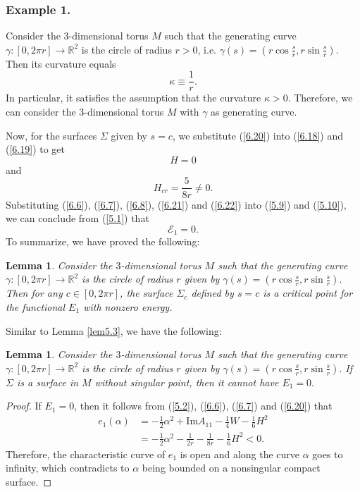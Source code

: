 \documentclass{amsart}
\newtheorem{lem}[theorem]{Lemma}
\theoremstyle{Corollary}
\numberwithin{equation}{section}
\begin{document}
\subsubsection{Example 1.} 
Consider the $3$-dimensional torus $M$ such that 
the generating curve $\gamma: [0,2\pi r]\to\mathbb{R}^2$ is the circle of radius $r>0$, i.e. 
$\gamma(s)=(r\cos\frac{s}{r},r\sin \frac{s}{r})$. 
Then its curvature equals
\begin{equation}\label{6.20}
\kappa\equiv \frac{1}{r}.
\end{equation}
In particular, it satisfies the assumption that the curvature $\kappa>0$. 
Therefore, we can consider the $3$-dimensional torus $M$ with $\gamma$ as generating curve. 

Now, for the surfaces $\Sigma$ given by $s=c$, 
we substitute (\ref{6.20}) into (\ref{6.18}) and (\ref{6.19}) to get
\begin{equation}\label{6.21}
H=0
\end{equation}
and 
\begin{equation}\label{6.22}
H_{cr}=\frac{5}{8r}\neq 0. 
\end{equation}
Substituting (\ref{6.6}), (\ref{6.7}), (\ref{6.8}), (\ref{6.21}) and (\ref{6.22}) into
(\ref{5.9}) and (\ref{5.10}), we can conclude from (\ref{5.1})
that 
$$\mathcal{E}_1=0.$$
To summarize, we have proved the following: 

\begin{lem}\label{lem6.1}
Consider the $3$-dimensional torus $M$ such that 
the generating curve  $\gamma: [0,2\pi r]\to\mathbb{R}^2$
is the circle of radius $r$ given by
$\gamma(s)=(r\cos\frac{s}{r},r\sin \frac{s}{r}).$
Then for any $c\in [0,2\pi r]$, the surface $\Sigma_c$ defined by $s=c$ 
is a critical point for the functional $E_1$ with nonzero energy. 
\end{lem}

Similar to Lemma \ref{lem5.3}, 
we have the following: 

\begin{lem} 
Consider the $3$-dimensional torus $M$ such that 
the generating curve  $\gamma: [0,2\pi r]\to\mathbb{R}^2$
is the circle of radius $r$ given by
$\gamma(s)=(r\cos\frac{s}{r},r\sin \frac{s}{r}).$
If $\Sigma$ is a surface in $M$ without singular point, 
then it cannot have $E_1=0.$
\end{lem}
\begin{proof}
If $E_1=0$, then it follows from (\ref{5.2}), (\ref{6.6}), (\ref{6.7}) and  (\ref{6.20}) that 
\begin{equation*}
\begin{split}
e_1(\alpha)&=-\frac{1}{2}\alpha^2+\mbox{Im} A_{11}-\frac{1}{4}W-\frac{1}{6}H^2\\
&=-\frac{1}{2}\alpha^2-\frac{1}{2r}-\frac{1}{8r}-\frac{1}{6}H^2<0.
\end{split}
\end{equation*}
Therefore, the characteristic curve of $e_1$ is open 
and along the curve $\alpha$ goes to infinity, which contradicts to $\alpha$ being 
bounded on a nonsingular compact surface.   
\end{proof}
\end{document}
